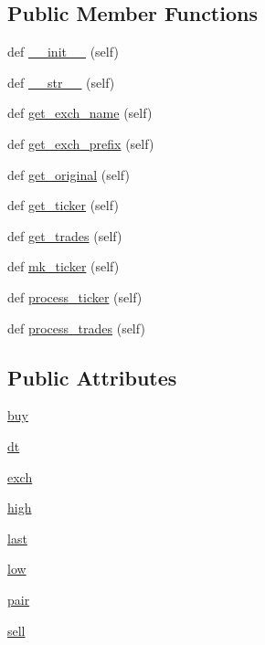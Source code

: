 \subsection*{Public Member Functions}
\begin{DoxyCompactItemize}
\item 
def \hyperlink{classexchange_1_1_fox_bit_a1f892137668748287116d902ef668d1a}{\+\_\+\+\_\+init\+\_\+\+\_\+} (self)
\item 
def \hyperlink{classexchange_1_1_fox_bit_ac21d1d06bf748dfd22ca35bc56a72e3b}{\+\_\+\+\_\+str\+\_\+\+\_\+} (self)
\item 
def \hyperlink{classexchange_1_1_fox_bit_a9bb3b48ee388b422f1d27c1774f0c9bf}{get\+\_\+exch\+\_\+name} (self)
\item 
def \hyperlink{classexchange_1_1_fox_bit_a091fb1b6e76b392b0a018a411f9da200}{get\+\_\+exch\+\_\+prefix} (self)
\item 
def \hyperlink{classexchange_1_1_fox_bit_a52bd09c5581ea3a18a4857432953533e}{get\+\_\+original} (self)
\item 
def \hyperlink{classexchange_1_1_fox_bit_aeb98818ddef05bb1beff5b55231d3760}{get\+\_\+ticker} (self)
\item 
def \hyperlink{classexchange_1_1_fox_bit_a80807753c2c595997857d097939c9283}{get\+\_\+trades} (self)
\item 
def \hyperlink{classexchange_1_1_fox_bit_a149b379722f351e0b890822a6220f0b0}{mk\+\_\+ticker} (self)
\item 
def \hyperlink{classexchange_1_1_fox_bit_a813481c37754cc0c6e0b1cefa0ec0889}{process\+\_\+ticker} (self)
\item 
def \hyperlink{classexchange_1_1_fox_bit_a244f81e91b04a1118d2d17f6c8497cb5}{process\+\_\+trades} (self)
\end{DoxyCompactItemize}
\subsection*{Public Attributes}
\begin{DoxyCompactItemize}
\item 
\hyperlink{classexchange_1_1_fox_bit_acb7e709cc05e8314b1bdacd32e4dfc80}{buy}
\item 
\hyperlink{classexchange_1_1_fox_bit_a363f8488eb0423f88519c085ae6f168f}{dt}
\item 
\hyperlink{classexchange_1_1_fox_bit_a3922433dcfe54e39c3c0da12fa252658}{exch}
\item 
\hyperlink{classexchange_1_1_fox_bit_a4f6dfaecbcc17ceadddf52d266d9c00d}{high}
\item 
\hyperlink{classexchange_1_1_fox_bit_a5cdbc327b005014dc3b8bb6fb54a12fd}{last}
\item 
\hyperlink{classexchange_1_1_fox_bit_acd666444cff98fe477651120ddb0f915}{low}
\item 
\hyperlink{classexchange_1_1_fox_bit_abfd6daf1cbad94eb74bba4c97fe4a574}{pair}
\item 
\hyperlink{classexchange_1_1_fox_bit_ac1fae4ef7a43254b71d7173a5cc6eeaf}{sell}
\end{DoxyCompactItemize}
